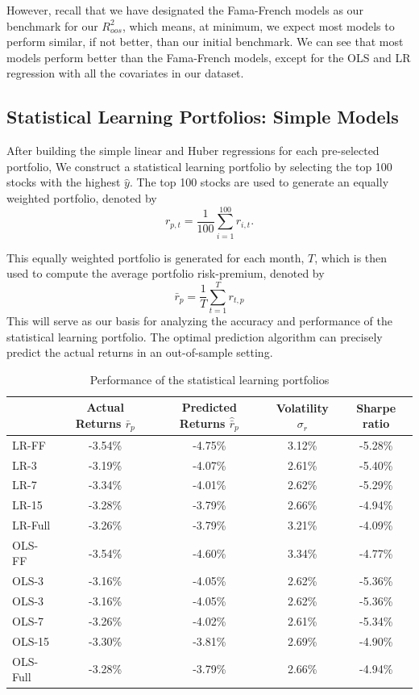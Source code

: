 However, recall that we have designated the Fama-French models as our benchmark for our $R^2_{oos}$, which means, at minimum, we expect most models to perform similar, if not better, than our initial benchmark. We can see that most models perform better than the Fama-French models, except for the OLS and LR regression with all the covariates in our dataset.

\subsection{Statistical Learning Portfolios: Simple Models}

After building the simple linear and Huber regressions for each pre-selected portfolio, We construct a statistical learning portfolio by selecting the top 100 stocks with the highest $\hat{y}$. The top 100 stocks are used to generate an equally weighted portfolio, denoted by
\begin{equation}\label{eq:eq_weight}
	r_{p,t}=\frac{1}{100}\sum_{i=1}^{100}r_{i,t}.
\end{equation}

This equally weighted portfolio is generated for each month, $T$, which is then used to compute the average portfolio risk-premium, denoted by
\begin{equation}\label{eq:avg_port_return}
	\bar{r}_p=\frac{1}{T}\sum_{t=1}^{T}r_{t,p}
\end{equation}
This will serve as our basis for analyzing the accuracy and performance of the statistical learning portfolio. The optimal prediction algorithm can precisely predict the actual returns in an out-of-sample setting.
\begin{table}[ht]
	\centering
	\caption{Performance of the statistical learning portfolios}
	\begin{tabular}[t]{lcccc}
		\toprule
		&Actual Returns $\bar{r}_{p}$&Predicted Returns $\hat{\bar{r}}_{p}$&Volatility $\sigma_r$ & Sharpe ratio \\
		\midrule
		LR-FF &-3.54\%	&-4.75\%&3.12\%&-5.28\%\\
		LR-3&-3.19\%	&-4.07\%&2.61\%&-5.40\%  \\
		LR-7&-3.34\%	&-4.01\%&2.62\%&-5.29\%  \\
		LR-15&-3.28\%	&-3.79\%&2.66\%&-4.94\% \\	   
		LR-Full&-3.26\%	&-3.79\%&3.21\%&-4.09\% \\				   
		OLS-FF&-3.54\%	&-4.60\%&3.34\%&-4.77\% \\		
		OLS-3&-3.16\%	&-4.05\%&2.62\%&-5.36\% \\				
		OLS-3&-3.16\%	&-4.05\%&2.62\%&-5.36\% \\
		OLS-7&-3.26\%	&-4.02\%&2.61\%&-5.34\% \\
		OLS-15&-3.30\%	&-3.81\%&2.69\%&-4.90\% \\
		OLS-Full&-3.28\%&-3.79\%&2.66\%&-4.94\% \\		
		\bottomrule
	\end{tabular}\label{tab:portolio_simple}
\end{table}

